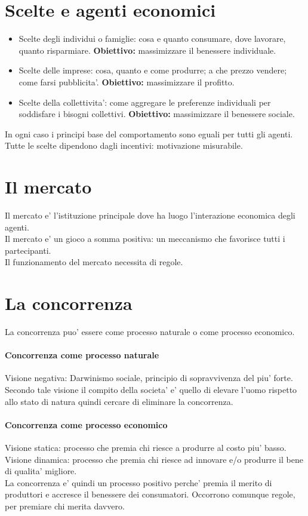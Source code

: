 \documentclass{report}
\begin{document}
	\section{Scelte e agenti economici}
	\begin{itemize}
		\item Scelte degli individui o famiglie: cosa e quanto consumare, dove lavorare, quanto risparmiare. \textbf{Obiettivo:} massimizzare il benessere individuale.
		\item Scelte delle imprese: cosa, quanto e come produrre; a che prezzo vendere; come farsi pubblicita'. \textbf{Obiettivo:} massimizzare il profitto.
		\item Scelte della collettivita': come aggregare le preferenze individuali per soddisfare i bisogni collettivi. \textbf{Obiettivo:} massimizzare il benessere sociale.
	\end{itemize}
	In ogni caso i principi base del comportamento sono eguali per tutti gli agenti. Tutte le scelte dipendono dagli incentivi: motivazione misurabile.
	\section{Il mercato}
	Il mercato e' l'istituzione principale dove ha luogo l'interazione economica degli agenti.\\
	Il mercato e' un gioco a somma positiva: un meccanismo che favorisce tutti i partecipanti.\\
	Il funzionamento del mercato necessita di regole.
	\section{La concorrenza}
	La concorrenza puo' essere come processo naturale o come processo economico.
	\paragraph{Concorrenza come processo naturale} 
	Visione negativa: Darwinismo sociale, principio di sopravvivenza del piu' forte. Secondo tale visione il compito della societa' e' quello di elevare l'uomo rispetto allo stato di natura quindi cercare di eliminare la concorrenza.
	\paragraph{Concorrenza come processo economico}
	Visione statica: processo che premia chi riesce a produrre al costo piu' basso.\\Visione dinamica: processo che premia chi riesce ad innovare e/o produrre il bene di qualita' migliore.\\La concorrenza e' quindi un processo positivo perche' premia il merito di produttori e accresce il benessere dei consumatori. Occorrono comunque regole, per premiare chi merita davvero.
\end{document}
